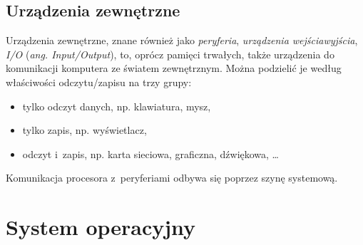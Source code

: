 \documentclass[12pt]{mwart}
\begin{document}
\subsection{Urządzenia zewnętrzne}
\indent
	Urządzenia zewnętrzne, znane również jako \emph{peryferia}, \emph{urządzenia wejścia\dywiz wyjścia}, \emph{I/O} (\emph{ang. Input/Output}),
	to, oprócz pamięci trwałych, także urządzenia do komunikacji komputera ze światem zewnętrznym. 
	Można podzielić je według właściwości odczytu/zapisu na trzy grupy:
	\begin{itemize}
		\item{tylko odczyt danych, np.} klawiatura, mysz, 
		\item{tylko zapis, np.} wyświetlacz,
		\item{odczyt i~zapis, np.} karta sieciowa, graficzna, dźwiękowa, \ldots
	\end{itemize}
\par
%
\indent
	Komunikacja procesora z~peryferiami odbywa się poprzez szynę systemową.
\par
%
\newpage
\section{System operacyjny}
%
\label{sec:system}
\end{document}
